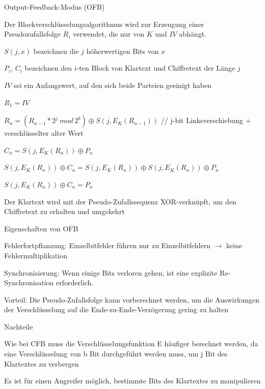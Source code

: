 \documentclass[a4paper]{article}
\begin{document}
\begin{multicols}{3}
      Output-Feedback-Modus (OFB)

      \begin{itemize*}
            \item Der Blockverschlüsselungsalgorithmus wird zur Erzeugung einer
            Pseudozufallsfolge $R_i$ verwendet, die nur von $K$ und $IV$
            abhängt.
            \begin{itemize*}
                  \item $S(j, x)$ bezeichnen die $j$ höherwertigen Bits von $x$
                  \item $P_i$, $C_i$ bezeichnen den $i$-ten Block von Klartext und Chiffretext der Länge $j$
                  \item $IV$ sei ein Anfangswert, auf den sich beide Parteien geeinigt haben
                  \item $R_1 = IV$
                  \item $R_n = (R_{n-1}* 2^j\ mod\ 2^b )\oplus S(j,E_K(R_{n-1}))$ // j-bit Linksverschiebung + verschlüsselter alter Wert
                  \item $C_n = S(j,E_K(R_n))\oplus P_n$
                  \item $S(j,E_K(R_n))\oplus C_n = S(j,E_K(R_n))\oplus S(j,E_K(R_n))\oplus P_n$
                  \item $S(j,E_K(R_n))\oplus C_n = P_n$
            \end{itemize*}
            \item Der Klartext wird mit der Pseudo-Zufallssequenz XOR-verknüpft, um den
            Chiffretext zu erhalten und umgekehrt
            \item Eigenschaften von OFB
            \begin{itemize*}
                  \item Fehlerfortpflanzung: Einzelbitfehler führen nur zu Einzelbitfehlern $\rightarrow$ keine Fehlermultiplikation
                  \item Synchronisierung: Wenn einige Bits verloren gehen, ist eine explizite Re-Synchronisation erforderlich.
                  \item Vorteil: Die Pseudo-Zufallsfolge kann vorberechnet werden, um die Auswirkungen der Verschlüsselung auf die Ende-zu-Ende-Verzögerung gering zu halten
                  \item Nachteile
                  \begin{itemize*} \item Wie bei CFB muss die Verschlüsselungsfunktion E häufiger berechnet werden, da eine Verschlüsselung von b Bit durchgeführt werden muss, um j Bit des Klartextes zu verbergen \item Es ist für einen Angreifer möglich, bestimmte Bits des Klartextes zu manipulieren \end{itemize*}
            \end{itemize*}
      \end{itemize*}


\end{multicols}
\end{document}
